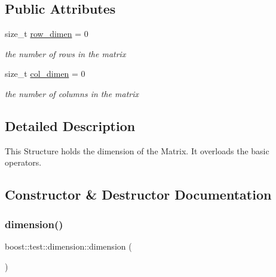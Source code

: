 \subsection*{Public Attributes}
\begin{DoxyCompactItemize}
\item 
size\+\_\+t \mbox{\hyperlink{structboost_1_1test_1_1dimension_acd374bb986e34a3f0333b5a26770de0f}{row\+\_\+dimen}} = 0
\begin{DoxyCompactList}\small\item\em the number of rows in the matrix \end{DoxyCompactList}\item 
size\+\_\+t \mbox{\hyperlink{structboost_1_1test_1_1dimension_aec2eb72845bed9b2997eda3985305edf}{col\+\_\+dimen}} = 0
\begin{DoxyCompactList}\small\item\em the number of columns in the matrix \end{DoxyCompactList}\end{DoxyCompactItemize}


\subsection{Detailed Description}
This Structure holds the dimension of the Matrix. It overloads the basic operators. 



\subsection{Constructor \& Destructor Documentation}
\mbox{\label{structboost_1_1test_1_1dimension_a994469ba24de50ea73d852cc92b80bd4}} 
\subsubsection{\texorpdfstring{dimension()}{dimension()}\hspace{0.1cm}{\footnotesize\ttfamily [1/2]}}
{\footnotesize\ttfamily boost\+::test\+::dimension\+::dimension (\begin{DoxyParamCaption}{ }\end{DoxyParamCaption})\hspace{0.3cm}{\ttfamily [default]}}



